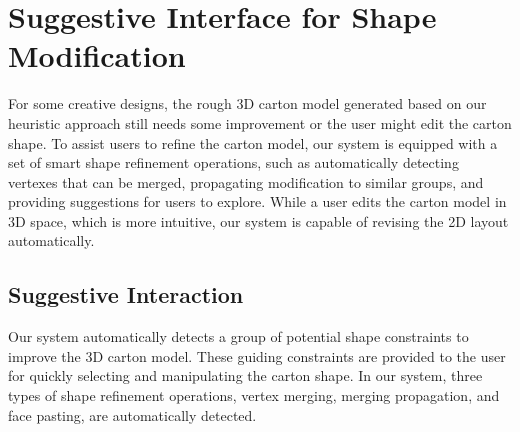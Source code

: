 \section{Suggestive Interface for Shape Modification }\label{sec:interaction}
%
For some creative designs, the rough 3D carton model generated based on our heuristic approach still needs some improvement or the user might edit the carton shape. 
To assist users to refine the carton model, our system is equipped with a set of smart shape refinement operations, such as automatically detecting vertexes that can be merged, propagating modification to similar groups, and providing suggestions for users to explore. 
%
While a user edits the carton model in 3D space, which is more intuitive, our system is capable of revising the 2D layout automatically. 



\subsection{Suggestive Interaction}

Our system automatically detects a group of potential shape constraints to improve the 3D carton model.
%
These guiding constraints are provided to the user for quickly selecting and manipulating the carton shape.
In our system, three types of shape refinement operations, vertex merging, merging propagation, and face pasting, are automatically detected.

%

